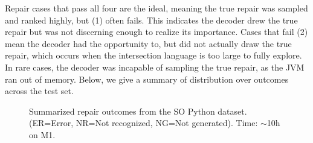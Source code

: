 \noindent Repair cases that pass all four are the ideal, meaning the true repair was sampled and ranked highly, but (1) often fails. This indicates the decoder drew the true repair but was not discerning enough to realize its importance. Cases that fail (2) mean the decoder had the opportunity to, but did not actually draw the true repair, which occurs when the intersection language is too large to fully explore. In rare cases, the decoder was incapable of sampling the true repair, as the JVM ran out of memory. Below, we give a summary of distribution over outcomes across the test set.

\begin{figure}[H]
\begin{center}
\resizebox{.73\textwidth}{!}{}
\caption{Summarized repair outcomes from the SO Python dataset. (ER=Error, NR=Not recognized, NG=Not generated). Time: $\sim$10h on M1.}
\end{center}
\end{figure}
